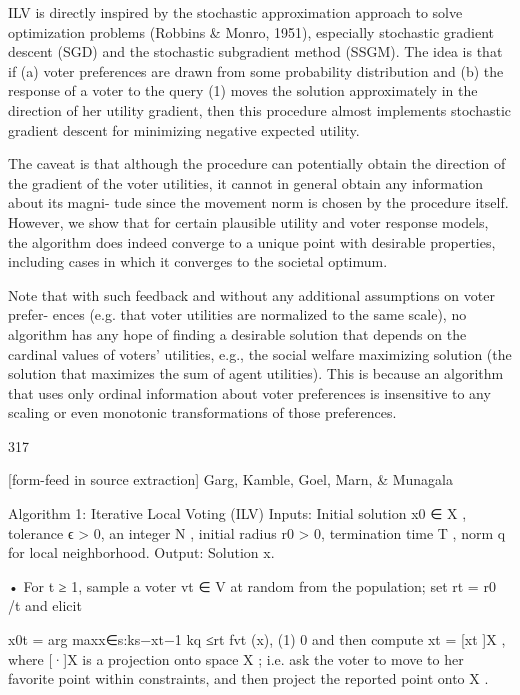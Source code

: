 \documentclass[10pt]{article}
\begin{document}
\begin{ReviewVerbatim}
   ILV is directly inspired by the stochastic approximation approach to solve optimization
problems (Robbins & Monro, 1951), especially stochastic gradient descent (SGD) and the
stochastic subgradient method (SSGM). The idea is that if (a) voter preferences are drawn
from some probability distribution and (b) the response of a voter to the query (1) moves the
solution approximately in the direction of her utility gradient, then this procedure              almost
implements stochastic gradient descent for minimizing negative expected utility.

   The caveat is that although the procedure can potentially obtain the direction of the
gradient of the voter utilities, it cannot in general obtain any information about its magni-
tude since the movement norm is chosen by the procedure itself. However, we show that for
certain plausible utility and voter response models, the algorithm does indeed converge to a
unique point with desirable properties, including cases in which it converges to the societal
optimum.

   Note that with such feedback and without any additional assumptions on voter prefer-
ences (e.g. that voter utilities are normalized to the same scale), no algorithm has any hope
of finding a desirable solution that depends on the cardinal values of voters' utilities, e.g., the
social welfare maximizing solution (the solution that maximizes the sum of agent utilities).
This is because an algorithm that uses only ordinal information about voter preferences is
insensitive to any scaling or even monotonic transformations of those preferences.



                                                 317

[form-feed in source extraction]
                          Garg, Kamble, Goel, Marn, & Munagala


 Algorithm 1: Iterative Local Voting (ILV)
  Inputs: Initial solution x0 ∈ X , tolerance ϵ > 0, an integer N , initial radius r0 > 0,
    termination time T , norm q for local neighborhood.
   Output:     Solution x.

       • For t ≥ 1, sample a voter vt ∈ V at random from the population; set rt = r0 /t
           and elicit


                             x0t = arg maxx∈{s:ks−xt−1 kq ≤rt } fvt (x),             (1)
                                         0
           and then compute xt = [xt ]X , where [·]X is a projection onto space X ; i.e. ask
           the voter to move to her favorite point within constraints, and then project the
           reported point onto X .



\end{ReviewVerbatim}
\end{document}
